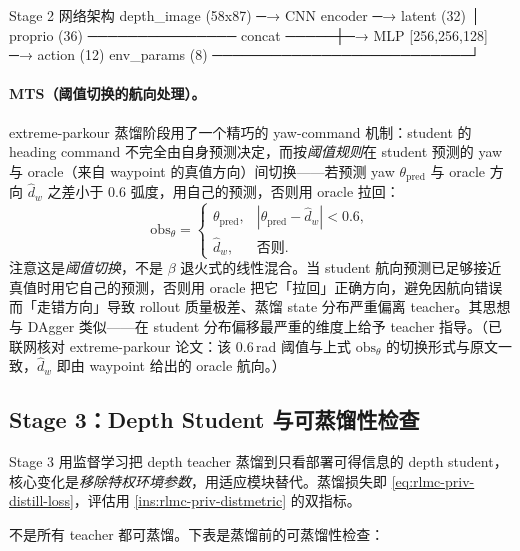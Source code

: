 \begin{codebox}[text]{Stage 2 网络架构}
depth_image (58x87) ─→ CNN encoder ─→ latent (32)
                                          │
proprio (36) ─────────────── concat ─────┼─→ MLP [256,256,128] ─→ action (12)
env_params (8) ──────────────────────────┘
\end{codebox}

\paragraph{MTS（阈值切换的航向处理）。} extreme-parkour 蒸馏阶段用了一个精巧的 yaw-command 机制：student 的 heading command 不完全由自身预测决定，而按\emph{阈值规则}在 student 预测的 yaw 与 oracle（来自 waypoint 的真值方向）间切换——若预测 yaw $\theta_{\text{pred}}$ 与 oracle 方向 $\hat d_w$ 之差小于 0.6 弧度，用自己的预测，否则用 oracle 拉回：
\begin{equation}
\text{obs}_\theta =
\begin{cases}
\theta_{\text{pred}}, & |\theta_{\text{pred}} - \hat d_w| < 0.6,\\[2pt]
\hat d_w, & \text{否则}.
\end{cases}
\label{eq:rlmc-priv-mts}
\end{equation}
注意这是\emph{阈值切换}，不是 $\beta$ 退火式的线性混合。当 student 航向预测已足够接近真值时用它自己的预测，否则用 oracle 把它「拉回」正确方向，避免因航向错误而「走错方向」导致 rollout 质量极差、蒸馏 state 分布严重偏离 teacher。其思想与 DAgger 类似——在 student 分布偏移最严重的维度上给予 teacher 指导。（已联网核对 extreme-parkour 论文：该 $0.6$\,rad 阈值与上式 $\mathrm{obs}_\theta$ 的切换形式与原文一致，$\hat d_w$ 即由 waypoint 给出的 oracle 航向。）

\subsection{Stage 3：Depth Student 与可蒸馏性检查}
\label{sec:rlmc-priv-stage3}

Stage 3 用监督学习把 depth teacher 蒸馏到只看部署可得信息的 depth student，核心变化是\emph{移除特权环境参数}，用适应模块替代。蒸馏损失即 \cref{eq:rlmc-priv-distill-loss}，评估用 \cref{ins:rlmc-priv-distmetric} 的双指标。

不是所有 teacher 都可蒸馏。下表是蒸馏前的可蒸馏性检查：

